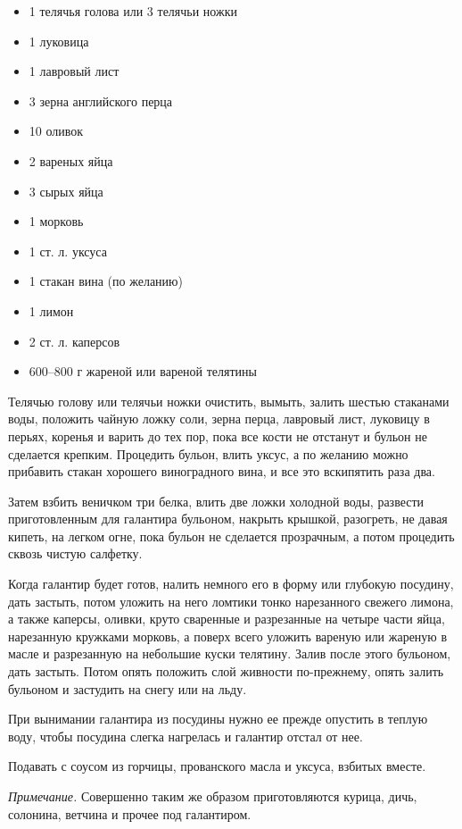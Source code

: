 \begin{itemize}
	\item 1 телячья голова или 3 телячьи ножки 
    \item 1 луковица 
    \item 1 лавровый лист
    \item 3 зерна английского перца
    \item 10 оливок 
    \item 2 вареных яйца 
    \item 3 сырых яйца
    \item 1 морковь
    \item 1 ст. л. уксуса 
    \item 1 стакан вина (по желанию)
    \item 1 лимон 
    \item 2 ст. л. каперсов 
    \item 600–800 г жареной или вареной телятины
\end{itemize}

Телячью голову или телячьи ножки очистить, вымыть, залить шестью стаканами воды, положить чайную ложку соли, зерна перца, лавровый лист, луковицу в перьях, коренья и варить до тех пор, пока все кости не отстанут и бульон не сделается крепким. Процедить бульон, влить уксус, а по желанию можно прибавить стакан хорошего виноградного вина, и все это вскипятить раза два.

Затем взбить веничком три белка, влить две ложки холодной воды, развести приготовленным для галантира бульоном, накрыть крышкой, разогреть, не давая кипеть, на легком огне, пока бульон не сделается прозрачным, а потом процедить сквозь чистую салфетку.

Когда галантир будет готов, налить немного его в форму или глубокую посудину, дать застыть, потом уложить на него ломтики тонко нарезанного свежего лимона, а также каперсы, оливки, круто сваренные и разрезанные на четыре части яйца, нарезанную кружками морковь, а поверх всего уложить вареную или жареную в масле и разрезанную на небольшие куски телятину. Залив после этого бульоном, дать застыть. Потом опять положить слой живности по-прежнему, опять залить бульоном и застудить на снегу или на льду.

При вынимании галантира из посудины нужно ее прежде опустить в теплую воду, чтобы посудина слегка нагрелась и галантир отстал от нее.

Подавать с соусом из горчицы, прованского масла и уксуса, взбитых вместе.

\emph{Примечание.} Совершенно таким же образом приготовляются курица, дичь, солонина, ветчина и прочее под галантиром.

